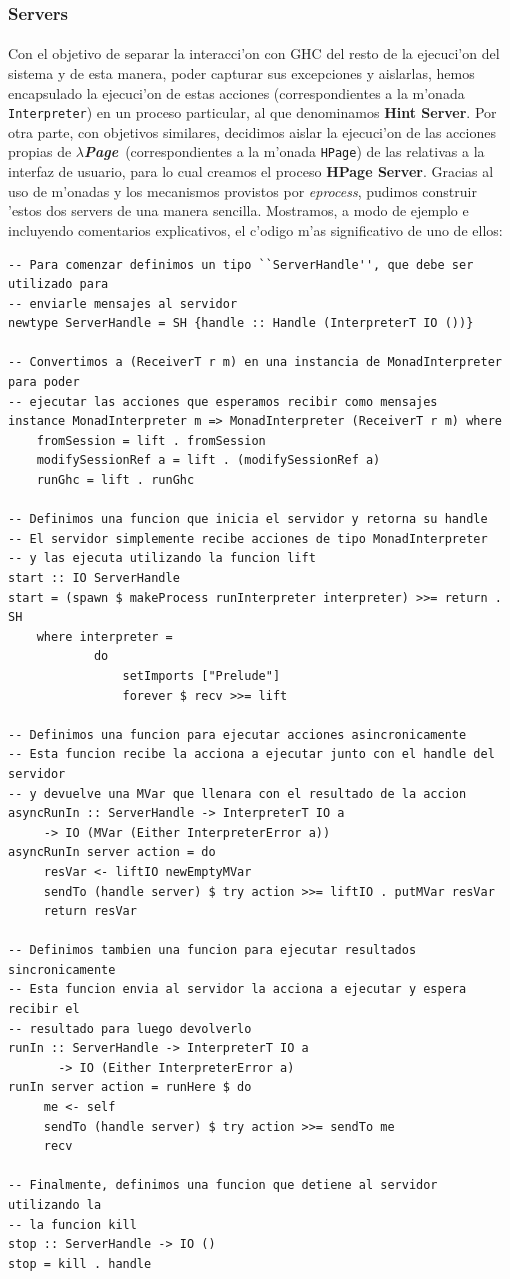 \documentclass[a4paper]{article}
\newcommand{\hpage}{\textbf{\textsl{$\lambda$Page}}}
\begin{document}
\subsubsection{Servers}
\paragraph{}Con el objetivo de separar la interacci'on con GHC del resto de la ejecuci'on del sistema y de esta manera, poder capturar sus excepciones y aislarlas, hemos encapsulado la ejecuci'on de estas acciones (correspondientes a la m'onada \texttt{Interpreter}) en un proceso particular, al que denominamos \textbf{Hint Server}.  Por otra parte, con objetivos similares, decidimos aislar la ejecuci'on de las acciones propias de \hpage\ (correspondientes a la m'onada \texttt{HPage}) de las relativas a la interfaz de usuario, para lo cual creamos el proceso \textbf{HPage Server}.  Gracias al uso de m'onadas y los mecanismos provistos por \textsl{eprocess}, pudimos construir 'estos dos servers de una manera sencilla.   Mostramos, a modo de ejemplo e incluyendo comentarios explicativos, el c'odigo m'as significativo de uno de ellos:
\begin{lstlisting}
-- Para comenzar definimos un tipo ``ServerHandle'', que debe ser utilizado para
-- enviarle mensajes al servidor
newtype ServerHandle = SH {handle :: Handle (InterpreterT IO ())}

-- Convertimos a (ReceiverT r m) en una instancia de MonadInterpreter para poder
-- ejecutar las acciones que esperamos recibir como mensajes
instance MonadInterpreter m => MonadInterpreter (ReceiverT r m) where
    fromSession = lift . fromSession
    modifySessionRef a = lift . (modifySessionRef a)
    runGhc = lift . runGhc 

-- Definimos una funcion que inicia el servidor y retorna su handle
-- El servidor simplemente recibe acciones de tipo MonadInterpreter
-- y las ejecuta utilizando la funcion lift
start :: IO ServerHandle
start = (spawn $ makeProcess runInterpreter interpreter) >>= return . SH
    where interpreter =
            do
                setImports ["Prelude"]
                forever $ recv >>= lift

-- Definimos una funcion para ejecutar acciones asincronicamente
-- Esta funcion recibe la acciona a ejecutar junto con el handle del servidor
-- y devuelve una MVar que llenara con el resultado de la accion
asyncRunIn :: ServerHandle -> InterpreterT IO a
     -> IO (MVar (Either InterpreterError a))
asyncRunIn server action = do
     resVar <- liftIO newEmptyMVar
     sendTo (handle server) $ try action >>= liftIO . putMVar resVar
     return resVar

-- Definimos tambien una funcion para ejecutar resultados sincronicamente
-- Esta funcion envia al servidor la acciona a ejecutar y espera recibir el 
-- resultado para luego devolverlo
runIn :: ServerHandle -> InterpreterT IO a
       -> IO (Either InterpreterError a)
runIn server action = runHere $ do
     me <- self
     sendTo (handle server) $ try action >>= sendTo me
     recv

-- Finalmente, definimos una funcion que detiene al servidor utilizando la
-- la funcion kill
stop :: ServerHandle -> IO ()
stop = kill . handle
\end{lstlisting}
\end{document}
